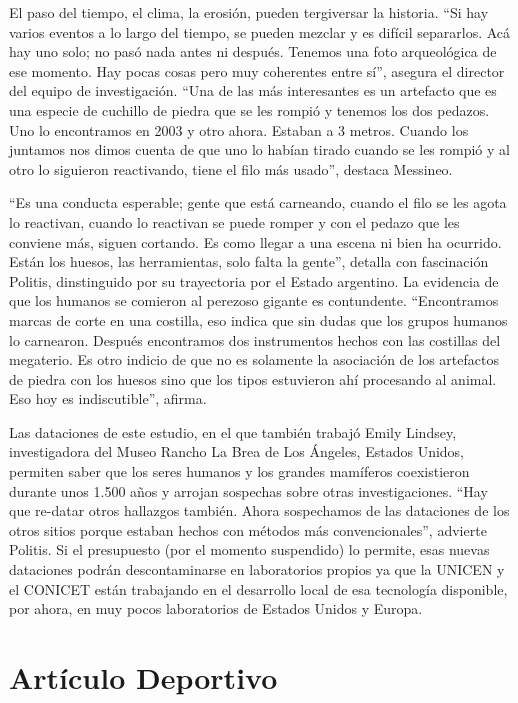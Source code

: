 El paso del tiempo, el clima, la erosión, pueden tergiversar la historia. ``Si hay varios eventos a lo largo del tiempo, se pueden mezclar y es difícil separarlos. Acá hay uno solo; no pasó nada antes ni después. Tenemos una foto arqueológica de ese momento. Hay pocas cosas pero muy coherentes entre sí'', asegura el director del equipo de investigación. ``Una de las más interesantes es un artefacto que es una especie de cuchillo de piedra que se les rompió y tenemos los dos pedazos. Uno lo encontramos en 2003 y otro ahora. Estaban a 3 metros. Cuando los juntamos nos dimos cuenta de que uno lo habían tirado cuando se les rompió y al otro lo siguieron reactivando, tiene el filo más usado'', destaca Messineo.

``Es una conducta esperable; gente que está carneando, cuando el filo se les agota lo reactivan, cuando lo reactivan se puede romper y con el pedazo que les conviene más, siguen cortando. Es como llegar a una escena ni bien ha ocurrido. Están los huesos, las herramientas, solo falta la gente'', detalla con fascinación Politis, dinstinguido por su trayectoria por el Estado argentino. La evidencia de que los humanos se comieron al perezoso gigante es contundente. ``Encontramos marcas de corte en una costilla, eso indica que sin dudas que los grupos humanos lo carnearon. Después encontramos dos instrumentos hechos con las costillas del megaterio. Es otro indicio de que no es solamente la asociación de los artefactos de piedra con los huesos sino que los tipos estuvieron ahí procesando al animal. Eso hoy es indiscutible'', afirma.

Las dataciones de este estudio, en el que también trabajó Emily Lindsey, investigadora del Museo Rancho La Brea de Los Ángeles, Estados Unidos, permiten saber que los seres humanos y los grandes mamíferos coexistieron durante unos 1.500 años y arrojan sospechas sobre otras investigaciones. ``Hay que re-datar otros hallazgos también. Ahora sospechamos de las dataciones de los otros sitios porque estaban hechos con métodos más convencionales'', advierte Politis. Si el presupuesto (por el momento suspendido) lo permite, esas nuevas dataciones podrán descontaminarse en laboratorios propios ya que la UNICEN y el CONICET están trabajando en el desarrollo local de esa tecnología disponible, por ahora, en muy pocos laboratorios de Estados Unidos y Europa.


\section{Artículo Deportivo}
\label{cap:sec:articulodeportivo}

